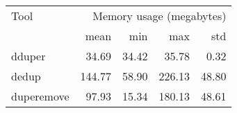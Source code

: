 \begin{tabular}{lrrrr}
\toprule
Tool & \multicolumn{4}{r}{Memory usage (megabytes)} \\
 & mean & min & max & std \\
\midrule
dduper & 34.69 & 34.42 & 35.78 & 0.32 \\
dedup & 144.77 & 58.90 & 226.13 & 48.80 \\
duperemove & 97.93 & 15.34 & 180.13 & 48.61 \\
\bottomrule
\end{tabular}

